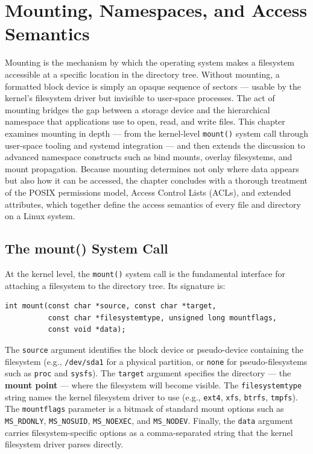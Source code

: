 \chapter{Mounting, Namespaces, and Access Semantics}
\label{ch:4}

Mounting is the mechanism by which the operating system makes a filesystem accessible at a specific location in the directory tree. Without mounting, a formatted block device is simply an opaque sequence of sectors --- usable by the kernel's filesystem driver but invisible to user-space processes. The act of mounting bridges the gap between a storage device and the hierarchical namespace that applications use to open, read, and write files. This chapter examines mounting in depth --- from the kernel-level \texttt{mount()} system call through user-space tooling and systemd integration --- and then extends the discussion to advanced namespace constructs such as bind mounts, overlay filesystems, and mount propagation. Because mounting determines not only where data appears but also how it can be accessed, the chapter concludes with a thorough treatment of the POSIX permissions model, Access Control Lists (ACLs), and extended attributes, which together define the access semantics of every file and directory on a Linux system.

\section{The mount() System Call}

At the kernel level, the \texttt{mount()} system call is the fundamental interface for attaching a filesystem to the directory tree. Its signature is:

\begin{verbatim}
int mount(const char *source, const char *target,
          const char *filesystemtype, unsigned long mountflags,
          const void *data);
\end{verbatim}

The \texttt{source} argument identifies the block device or pseudo-device containing the filesystem (e.g., \texttt{/dev/sda1} for a physical partition, or \texttt{none} for pseudo-filesystems such as \texttt{proc} and \texttt{sysfs}). The \texttt{target} argument specifies the directory --- the \textbf{mount point} --- where the filesystem will become visible. The \texttt{filesystemtype} string names the kernel filesystem driver to use (e.g., \texttt{ext4}, \texttt{xfs}, \texttt{btrfs}, \texttt{tmpfs}). The \texttt{mountflags} parameter is a bitmask of standard mount options such as \texttt{MS\_RDONLY}, \texttt{MS\_NOSUID}, \texttt{MS\_NOEXEC}, and \texttt{MS\_NODEV}. Finally, the \texttt{data} argument carries filesystem-specific options as a comma-separated string that the kernel filesystem driver parses directly.

